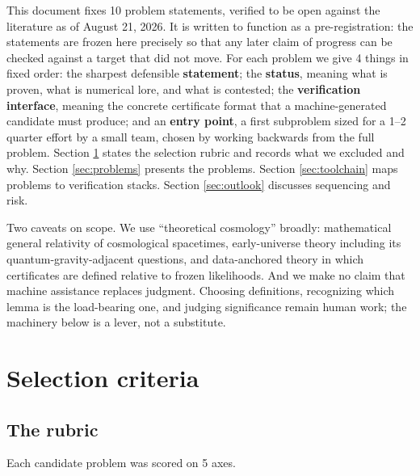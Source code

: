 \documentclass[11pt,letterpaper]{article}
\begin{document}
This document fixes 10 problem statements, verified to be open against the literature as of August 21, 2026. It is written to function as a pre-registration: the statements are frozen here precisely so that any later claim of progress can be checked against a target that did not move. For each problem we give 4 things in fixed order: the sharpest defensible \textbf{statement}; the \textbf{status}, meaning what is proven, what is numerical lore, and what is contested; the \textbf{verification interface}, meaning the concrete certificate format that a machine-generated candidate must produce; and an \textbf{entry point}, a first subproblem sized for a 1--2 quarter effort by a small team, chosen by working backwards from the full problem. Section \ref{sec:criteria} states the selection rubric and records what we excluded and why. Section \ref{sec:problems} presents the problems. Section \ref{sec:toolchain} maps problems to verification stacks. Section \ref{sec:outlook} discusses sequencing and risk.

Two caveats on scope. We use ``theoretical cosmology'' broadly: mathematical general relativity of cosmological spacetimes, early-universe theory including its quantum-gravity-adjacent questions, and data-anchored theory in which certificates are defined relative to frozen likelihoods. And we make no claim that machine assistance replaces judgment. Choosing definitions, recognizing which lemma is the load-bearing one, and judging significance remain human work; the machinery below is a lever, not a substitute.

\section{Selection criteria}
\label{sec:criteria}

\subsection{The rubric}

Each candidate problem was scored on 5 axes.
\end{document}
